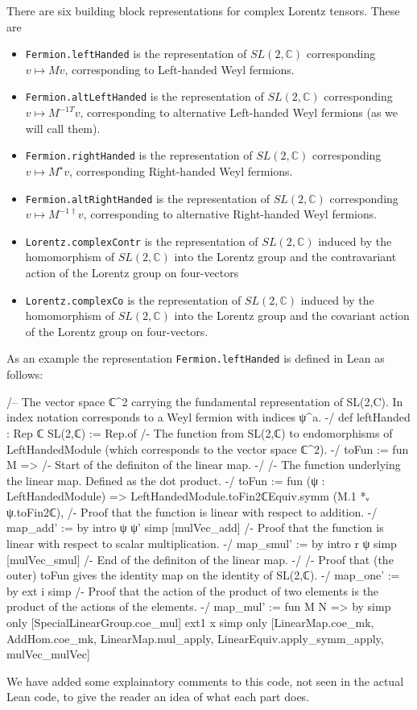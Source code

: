\documentclass[a4paper, 11pt]{article}
\begin{document}
There are six building block representations for complex Lorentz tensors. These are
\begin{itemize}
  \item \lstinline|Fermion.leftHanded| is the
   representation of $SL(2, \mathbb{C})$ corresponding 
      $v \mapsto M v$, corresponding to Left-handed Weyl fermions.
  \item \lstinline|Fermion.altLeftHanded| is the
  representation of $SL(2, \mathbb{C})$ corresponding 
     $v \mapsto M^{-1 T} v$, corresponding to alternative Left-handed Weyl fermions (as we will 
     call them).
  \item \lstinline|Fermion.rightHanded| is the representation of $SL(2, \mathbb{C})$ corresponding 
  $v \mapsto M^\star v$, corresponding Right-handed Weyl fermions.
  \item \lstinline|Fermion.altRightHanded| is the representation of $SL(2, \mathbb{C})$ corresponding
  $v \mapsto M^{-1 \dagger} v$, corresponding to alternative Right-handed Weyl fermions.
  \item \lstinline|Lorentz.complexContr| is the representation of $SL(2, \mathbb{C})$ 
   induced by the homomorphism of $SL(2, \mathbb{C})$ into the Lorentz group and the contravariant 
   action of the Lorentz group on four-vectors
  \item \lstinline|Lorentz.complexCo| is the representation of $SL(2, \mathbb{C})$
    induced by the homomorphism of $SL(2, \mathbb{C})$ into the Lorentz group and the covariant
    action of the Lorentz group on four-vectors.
\end{itemize}
As an example the representation \lstinline|Fermion.leftHanded| is defined in Lean as follows:
\begin{codeLong}
/-- The vector space ℂ^2 carrying the fundamental representation of SL(2,C).
  In index notation corresponds to a Weyl fermion with indices ψ^a. -/
def leftHanded : Rep ℂ SL(2,ℂ) := Rep.of {
  /- The function from SL(2,ℂ) to endomorphisms of LeftHandedModule 
    (which corresponds to the vector space ℂ^2). -/
  toFun := fun M => {
    /- Start of the definiton of the linear map. -/
    /- The function underlying the linear map. Defined as the dot product. -/
    toFun := fun (ψ : LeftHandedModule) =>
      LeftHandedModule.toFin2ℂEquiv.symm (M.1 *ᵥ ψ.toFin2ℂ),
    /- Proof that the function is linear with respect to addition. -/
    map_add' := by
      intro ψ ψ'
      simp [mulVec_add]
    /- Proof that the function is linear with respect to scalar multiplication. -/
    map_smul' := by
      intro r ψ
      simp [mulVec_smul]
    /- End of the definiton of the linear map. -/}
  /- Proof that (the outer) toFun gives the identity map on the identity of SL(2,ℂ). -/
  map_one' := by
    ext i
    simp
  /- Proof that the action of the product of two elements is 
    the product of the actions of the elements. -/
  map_mul' := fun M N => by
    simp only [SpecialLinearGroup.coe_mul]
    ext1 x
    simp only [LinearMap.coe_mk, AddHom.coe_mk, LinearMap.mul_apply, LinearEquiv.apply_symm_apply,
      mulVec_mulVec]}
\end{codeLong} 
We have added some explainatory comments to this code, not seen in the actual Lean code, to give 
the reader an idea of what each part does. 
\end{document}
